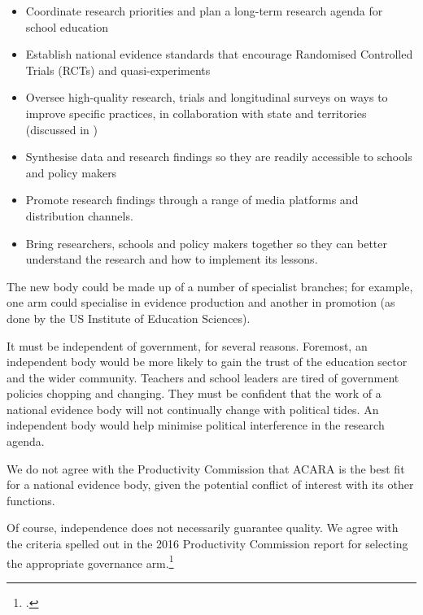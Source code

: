 \begin{itemize}
    \item Coordinate research priorities and plan a long-term research agenda for school education
    \item Establish national evidence standards that encourage Randomised Controlled Trials (RCTs) and quasi-experiments
    \item Oversee high-quality research, trials and longitudinal surveys on ways to improve specific practices, in collaboration with state and territories (discussed in )
    \item Synthesise data and research findings so they are readily accessible to schools and policy makers
    \item Promote research findings through a range of media platforms and distribution channels.
    \item Bring researchers, schools and policy makers together so they can better understand the research and how to implement its lessons. \end{itemize}

The new body could be made up of a number of specialist branches; for example, one arm could specialise in evidence production and another in promotion (as done by the US Institute of Education Sciences).

It must be independent of government, for several reasons. Foremost, an independent body would be more likely to gain the trust of the education sector and the wider community. Teachers and school leaders are tired of government policies chopping and changing. They must be confident that the work of a national evidence body will not continually change with political tides. An independent body would help minimise political interference in the research agenda.

We do not agree with the Productivity Commission that ACARA is the best fit for a national evidence body, given the potential conflict of interest with its other functions.

Of course, independence does not necessarily guarantee quality. We agree with the criteria spelled out in the 2016 Productivity Commission report for selecting the appropriate governance arm.\footcite{ProductivityCommission2016NationalEvidenceBase}  

    

    
